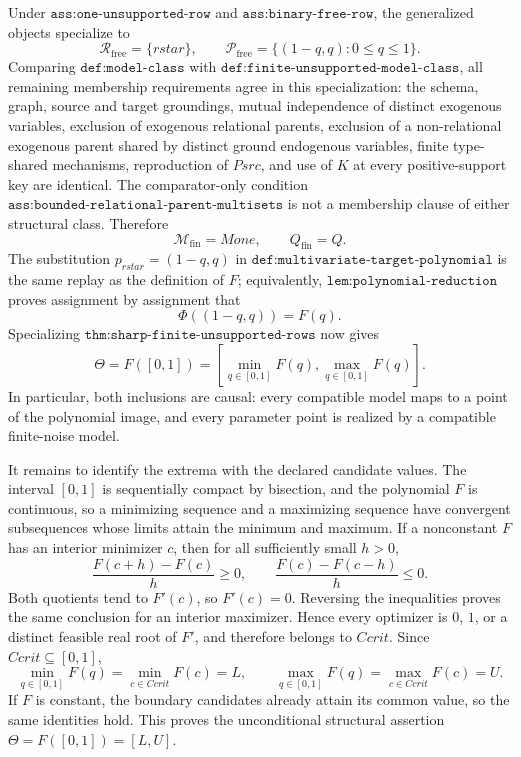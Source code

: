 Under \(\texttt{ass:one-unsupported-row}\) and \(\texttt{ass:binary-free-row}\), the generalized objects specialize to
\[
 \mathcal R_{\mathrm{free}}=\{rstar\},
 \qquad
 \mathcal P_{\mathrm{free}}=\{(1-q,q):0\leq q\leq1\}.
\]
Comparing \(\texttt{def:model-class}\) with \(\texttt{def:finite-unsupported-model-class}\), all remaining membership requirements agree in this specialization: the schema, graph, source and target groundings, mutual independence of distinct exogenous variables, exclusion of exogenous relational parents, exclusion of a non-relational exogenous parent shared by distinct ground endogenous variables, finite type-shared mechanisms, reproduction of \(Psrc\), and use of \(K\) at every positive-support key are identical.  The comparator-only condition \(\texttt{ass:bounded-relational-parent-multisets}\) is not a membership clause of either structural class.  Therefore
\[
 \mathcal M_{\mathrm{fin}}=Mone,
 \qquad Q_{\mathrm{fin}}=Q.
\]
The substitution \(p_{rstar}=(1-q,q)\) in \(\texttt{def:multivariate-target-polynomial}\) is the same replay as the definition of \(F\); equivalently, \(\texttt{lem:polynomial-reduction}\) proves assignment by assignment that
\[
 \Phi((1-q,q))=F(q).
\]
Specializing \(\texttt{thm:sharp-finite-unsupported-rows}\) now gives
\[
 \Theta=F([0,1])
 =\left[\min_{q\in[0,1]}F(q),
         \max_{q\in[0,1]}F(q)\right].
\]
In particular, both inclusions are causal: every compatible model maps to a point of the polynomial image, and every parameter point is realized by a compatible finite-noise model.

It remains to identify the extrema with the declared candidate values.  The interval \([0,1]\) is sequentially compact by bisection, and the polynomial \(F\) is continuous, so a minimizing sequence and a maximizing sequence have convergent subsequences whose limits attain the minimum and maximum.  If a nonconstant \(F\) has an interior minimizer \(c\), then for all sufficiently small \(h>0\),
\[
 \frac{F(c+h)-F(c)}{h}\geq0,
 \qquad
 \frac{F(c)-F(c-h)}{h}\leq0.
\]
Both quotients tend to \(F'(c)\), so \(F'(c)=0\).  Reversing the inequalities proves the same conclusion for an interior maximizer.  Hence every optimizer is \(0\), \(1\), or a distinct feasible real root of \(F'\), and therefore belongs to \(Ccrit\).  Since \(Ccrit\subseteq[0,1]\),
\[
 \min_{q\in[0,1]}F(q)=\min_{c\in Ccrit}F(c)=L,
 \qquad
 \max_{q\in[0,1]}F(q)=\max_{c\in Ccrit}F(c)=U.
\]
If \(F\) is constant, the boundary candidates already attain its common value, so the same identities hold.  This proves the unconditional structural assertion \(\Theta=F([0,1])=[L,U]\).

